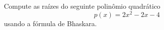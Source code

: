 \documentclass[12pt]{article}
\begin{document}
\begin{exr}\label{exr:bhaskara}
  Compute as raízes do seguinte polinômio quadrático
  \begin{equation}
    p(x) = 2x^2 - 2x - 4
  \end{equation}
  usando a fórmula de Bhaskara{\bhaskara}.
\end{exr}





\end{document}
